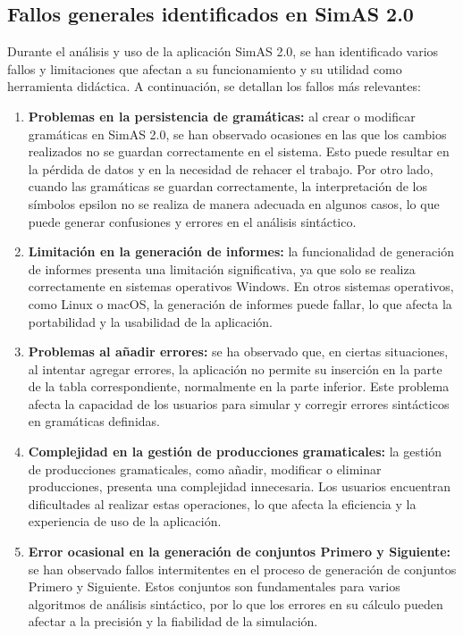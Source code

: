 \subsection{Fallos generales identificados en SimAS 2.0}

Durante el análisis y uso de la aplicación SimAS 2.0, se han identificado varios fallos y limitaciones que afectan a su funcionamiento y su utilidad como herramienta didáctica. A continuación, se detallan los fallos más relevantes:

\begin{enumerate}
    \item \textbf{Problemas en la persistencia de gramáticas:} al crear o modificar gramáticas en SimAS 2.0, se han observado ocasiones en las que los cambios realizados no se guardan correctamente en el sistema. Esto puede resultar en la pérdida de datos y en la necesidad de rehacer el trabajo. Por otro lado, cuando las gramáticas se guardan correctamente, la interpretación de los símbolos epsilon no se realiza de manera adecuada en algunos casos, lo que puede generar confusiones y errores en el análisis sintáctico.

    \item \textbf{Limitación en la generación de informes:} la funcionalidad de generación de informes presenta una limitación significativa, ya que solo se realiza correctamente en sistemas operativos Windows. En otros sistemas operativos, como Linux o macOS, la generación de informes puede fallar, lo que afecta la portabilidad y la usabilidad de la aplicación.
    
    \item \textbf{Problemas al añadir errores:} se ha observado que, en ciertas situaciones, al intentar agregar errores, la aplicación no permite su inserción en la parte de la tabla correspondiente, normalmente en la parte inferior. Este problema afecta la capacidad de los usuarios para simular y corregir errores sintácticos en gramáticas definidas.
    
    \item \textbf{Complejidad en la gestión de producciones gramaticales:} la gestión de producciones gramaticales, como añadir, modificar o eliminar producciones, presenta una complejidad innecesaria. Los usuarios encuentran dificultades al realizar estas operaciones, lo que afecta la eficiencia y la experiencia de uso de la aplicación.
    
    \item \textbf{Error ocasional en la generación de conjuntos Primero y Siguiente:} se han observado fallos intermitentes en el proceso de generación de conjuntos Primero y Siguiente. Estos conjuntos son fundamentales para varios algoritmos de análisis sintáctico, por lo que los errores en su cálculo pueden afectar a la precisión y la fiabilidad de la simulación.
    

\end{enumerate}
